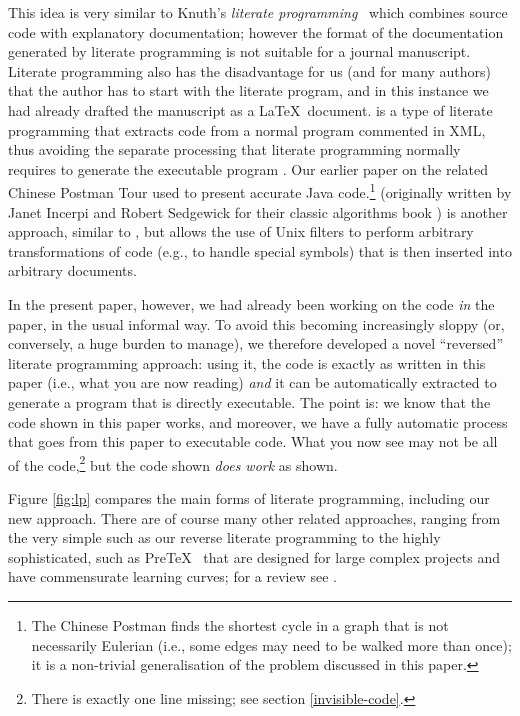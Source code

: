 \documentclass[prodmode,acmtecs]{acmsmall} %
\begin{document}
This idea is very similar to Knuth's \emph{literate programming}~\cite{litprog} which combines source code with explanatory documentation; however the format of the documentation generated by literate programming is not suitable for a journal manuscript. Literate programming also has the disadvantage for us (and for many authors) that the author has to start with the literate program, and in this instance we had already drafted the manuscript as a \LaTeX\ document.  is a type of literate programming that extracts code from a normal program commented in XML, thus avoiding the separate processing that literate programming normally requires to generate the executable program \cite{warp}. Our earlier paper %
on the related Chinese Postman Tour \cite{cpp} used  to present accurate Java code.\footnote{The Chinese Postman finds the shortest cycle in a graph that is not necessarily Eulerian (i.e., some edges may need to be walked more than once); it is a non-trivial generalisation of the problem discussed in this paper.}  \cite{loom} (originally written by Janet Incerpi and Robert Sedgewick for their classic algorithms book \cite{sedgeoriginalbook}) is another approach, similar to , but allows the use of Unix filters to perform arbitrary transformations of code (e.g., to handle special symbols) that is then inserted into arbitrary documents. 

In the present paper, however, we had already been working on the code \emph{in\/} the paper, in the usual informal way. To avoid this becoming increasingly sloppy (or, conversely, a huge burden to manage), we therefore developed a novel ``reversed'' literate programming approach: using it, the code is exactly as written in this paper (i.e., what you are now reading) \emph{and\/} it can be automatically extracted to generate a program that is directly executable. The point is: we know that the code shown in this paper works, and moreover, we have a fully automatic process that goes from this paper to executable code. What you now see may not be all of the code,\footnote{There is exactly one line missing; see section \ref{invisible-code}.} but the code shown \emph{does work\/} as shown.  


Figure \ref{fig:lp} compares the main forms of literate programming, including our new approach. There are of course many other related approaches, ranging from the very simple such as our reverse literate programming to the highly sophisticated, such as Pre\TeX\ \cite{pretex} that are designed for large complex projects and have commensurate learning curves; for a review see \cite{warp}.
\end{document}
